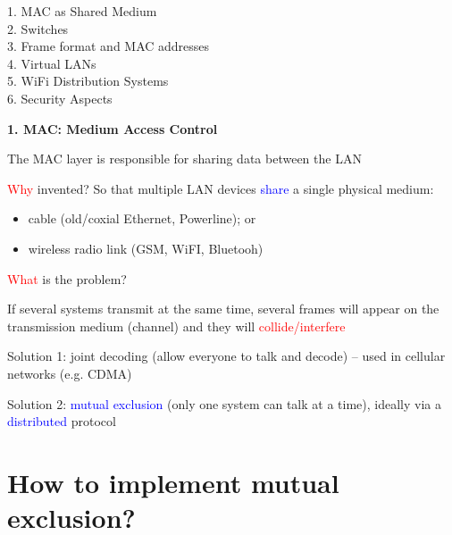 \documentclass[11pt]{article}
\begin{document}
1. MAC as Shared Medium \\
2. Switches \\
3. Frame format and MAC addresses \\
4. Virtual LANs \\
5. WiFi Distribution Systems \\
6. Security Aspects \\

\vspace{0.5cm}
\begin{center}
  {\LARGE \textbf{1. MAC: Medium Access Control}}
\end{center}

\vspace{1cm}

The MAC layer is responsible for sharing data between the LAN


\textcolor{red}{Why} invented? So that multiple LAN devices \textcolor{blue}{share} a single physical medium:
\begin{itemize}
	\begin{itemize}
		\item cable (old/coxial Ethernet, Powerline); or
		\item wireless radio link (GSM, WiFI, Bluetooh)
	\end{itemize}
\end{itemize}

\textcolor{red}{What} is the problem?

If several systems transmit at the same time, several frames will appear on the transmission medium (channel) and they will \textcolor{red}{collide/interfere}

Solution 1: joint decoding (allow everyone to talk and decode) -- used in cellular networks (e.g. CDMA)

Solution 2: \textcolor{blue}{mutual exclusion} (only one system can talk at a time), ideally via a \textcolor{blue}{distributed} protocol
\vspace{1cm}

\section*{How to implement mutual exclusion?}
\end{document}
